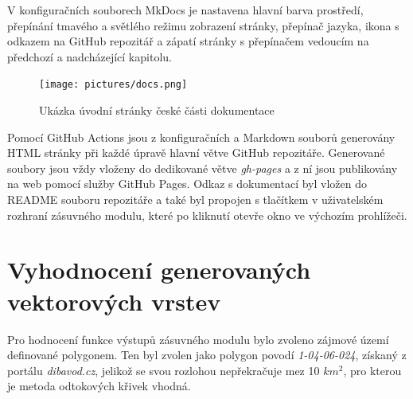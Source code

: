 \documentclass[a4paper,oneside,12pt]{book}
\begin{document}
\hspace{10mm} V konfiguračních souborech MkDocs je nastavena hlavní barva prostředí, přepínání tmavého a světlého režimu zobrazení stránky, přepínač jazyka, ikona s odkazem na GitHub repozitář a zápatí stránky s přepínačem vedoucím na předchozí a nadcházející kapitolu.

\begin{figure}[H] \label{obr23}
\centering
\texttt{[image: pictures/docs.png]}
\caption{Ukázka úvodní stránky české části dokumentace}
\label{fig:docs}
\end{figure}

\hspace{10mm} Pomocí GitHub Actions jsou z konfiguračních a Markdown souborů generovány HTML stránky při každé úpravě hlavní větve GitHub repozitáře. Generované soubory jsou vždy vloženy do dedikované větve \textit{gh-pages} a z ní jsou publikovány na web pomocí služby GitHub Pages. Odkaz s dokumentací byl vložen do README souboru repozitáře a také byl propojen s tlačítkem v uživatelském rozhraní zásuvného modulu, které po kliknutí otevře okno ve výchozím prohlížeči.

\section{Vyhodnocení generovaných vektorových vrstev} \label{casestudyiguess}

\hspace{10mm} Pro hodnocení funkce výstupů zásuvného modulu bylo zvoleno zájmové území definované polygonem. Ten byl zvolen jako polygon povodí \textit{1-04-06-024}, získaný z portálu \textit{dibavod.cz}, jelikož se svou rozlohou nepřekračuje mez 10 $km^{2}$, pro kterou je metoda odtokových křivek vhodná. \cite{Pasak1983}
\end{document}
